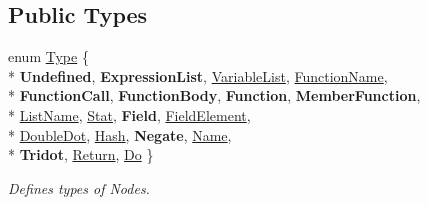 \subsection*{Public Types}
\begin{DoxyCompactItemize}
\item 
enum \hyperlink{classNode_a8dad370be1595f49e0a7c2406a91e867}{Type} \{ \\*
{\bfseries Undefined}, 
{\bfseries Expression\+List}, 
\hyperlink{classNode_a8dad370be1595f49e0a7c2406a91e867a8fb6b35a2762acd63c8d42fc8575889e}{Variable\+List}, 
\hyperlink{classNode_a8dad370be1595f49e0a7c2406a91e867a496a823a62742a6ebb9f4fb757e02ce4}{Function\+Name}, 
\\*
{\bfseries Function\+Call}, 
{\bfseries Function\+Body}, 
{\bfseries Function}, 
{\bfseries Member\+Function}, 
\\*
\hyperlink{classNode_a8dad370be1595f49e0a7c2406a91e867a1a3ec9cbafad290cdd86122121b61391}{List\+Name}, 
\hyperlink{classNode_a8dad370be1595f49e0a7c2406a91e867a82f82cd405ee2ded93d8f9133e2f5f34}{Stat}, 
{\bfseries Field}, 
\hyperlink{classNode_a8dad370be1595f49e0a7c2406a91e867a12f1dc625982c23638509a4039543b59}{Field\+Element}, 
\\*
\hyperlink{classNode_a8dad370be1595f49e0a7c2406a91e867a9b98ce84dc5f406e0743acc13f03aaf6}{Double\+Dot}, 
\hyperlink{classNode_a8dad370be1595f49e0a7c2406a91e867ad05e3fa202cceccd870b5aac8467623c}{Hash}, 
{\bfseries Negate}, 
\hyperlink{classNode_a8dad370be1595f49e0a7c2406a91e867a183ed1e4cc2be1e5df44762c452281ef}{Name}, 
\\*
{\bfseries Tridot}, 
\hyperlink{classNode_a8dad370be1595f49e0a7c2406a91e867aab13754f7d035f904f4fc861bc6ad211}{Return}, 
\hyperlink{classNode_a8dad370be1595f49e0a7c2406a91e867a0636a6d172da086b233f0170ba995a81}{Do}
 \}
\begin{DoxyCompactList}\small\item\em Defines types of Nodes. \end{DoxyCompactList}\end{DoxyCompactItemize}
